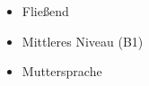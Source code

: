 \begin{itemize}[leftmargin=*]
	\item {} Fließend
	\item {} Mittleres Niveau (B1)
	\item {} Muttersprache
\end{itemize}
\Sep
